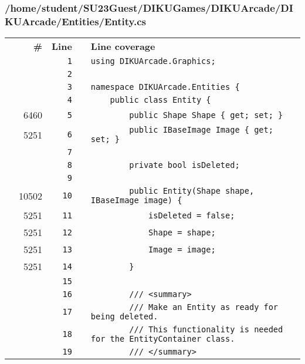\documentclass[a4paper,landscape,10pt]{article}
\begin{document}
\subsubsection{/home/student/SU23Guest/DIKUGames/DIKUArcade/DIKUArcade/Entities/Entity.cs}
\begin{longtable}[l]{lrrll}
\textbf{} & \textbf{\#} & \textbf{Line} & \textbf{} & \textbf{Line coverage}\\
\cellcolor{gray} &  & \verb~1~ & & \verb~using DIKUArcade.Graphics;~\\
\cellcolor{gray} &  & \verb~2~ & & \verb~~\\
\cellcolor{gray} &  & \verb~3~ & & \verb~namespace DIKUArcade.Entities {~\\
\cellcolor{gray} &  & \verb~4~ & & \verb~    public class Entity {~\\
\cellcolor{green} & 6460 & \verb~5~ & & \verb~        public Shape Shape { get; set; }~\\
\cellcolor{green} & 5251 & \verb~6~ & & \verb~        public IBaseImage Image { get; set; }~\\
\cellcolor{gray} &  & \verb~7~ & & \verb~~\\
\cellcolor{gray} &  & \verb~8~ & & \verb~        private bool isDeleted;~\\
\cellcolor{gray} &  & \verb~9~ & & \verb~~\\
\cellcolor{green} & 10502 & \verb~10~ & & \verb~        public Entity(Shape shape, IBaseImage image) {~\\
\cellcolor{green} & 5251 & \verb~11~ & & \verb~            isDeleted = false;~\\
\cellcolor{green} & 5251 & \verb~12~ & & \verb~            Shape = shape;~\\
\cellcolor{green} & 5251 & \verb~13~ & & \verb~            Image = image;~\\
\cellcolor{green} & 5251 & \verb~14~ & & \verb~        }~\\
\cellcolor{gray} &  & \verb~15~ & & \verb~~\\
\cellcolor{gray} &  & \verb~16~ & & \verb~        /// <summary>~\\
\cellcolor{gray} &  & \verb~17~ & & \verb~        /// Make an Entity as ready for being deleted.~\\
\cellcolor{gray} &  & \verb~18~ & & \verb~        /// This functionality is needed for the EntityContainer class.~\\
\cellcolor{gray} &  & \verb~19~ & & \verb~        /// </summary>~\\

\end{longtable}
\end{document}
